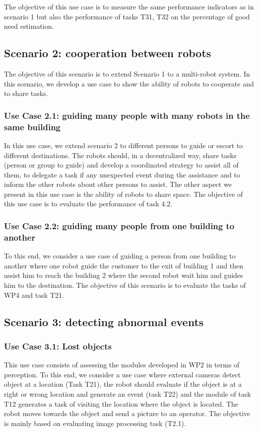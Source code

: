 The objective of this use case is to measure the same performance indicators as in scenario 1 but also the performance of tasks T31, T32 on the percentage of good need estimation. 

\subsection {Scenario 2: cooperation between robots}
The objective of this scenario is to extend Scenario 1 to a multi-robot system. In this scenario, we develop a use case to show the ability of robots to cooperate and to share tasks. 

\subsubsection*{Use Case 2.1: guiding many people with many robots in the same building}
In this use case, we extend  scenario 2 to different persons to guide or escort to different destinations. The robots should, in a decentralized way, share tasks (person or group to guide) and develop a coordinated strategy to assist all of them, to delegate a task if any unexpected event during the assistance and to inform the other robots about other persons to assist. The other aspect we present in this use case is the ability of robots to share space. 
The objective of this use case is to evaluate the performance of task 4.2.

\subsubsection*{Use Case 2.2: guiding many people from one building to another}
To this end,  we consider a use case  of guiding a person from one building to another where one robot guide the customer to the exit of building 1 and then  assist him to reach the building 2 where the second robot wait him and guides him to the destination. 
The objective of this scenario is to evaluate the tasks of WP4 and task T21. 

\subsection{Scenario 3: detecting abnormal events}

\subsubsection*{Use Case 3.1: Lost objects}
This use case consists of assessing the modules developed in WP2 in terms of perception. To this end, we consider a use case where external cameras detect object at a location (Task T21), the robot should evaluate if the  object is at a right or wrong location and generate an event (task T22) and the module of task T12 generates a task of visiting the location where the object is located. The robot moves towards the object and send a picture to an operator. 
The objective is mainly based on evaluating image processing task (T2.1).

